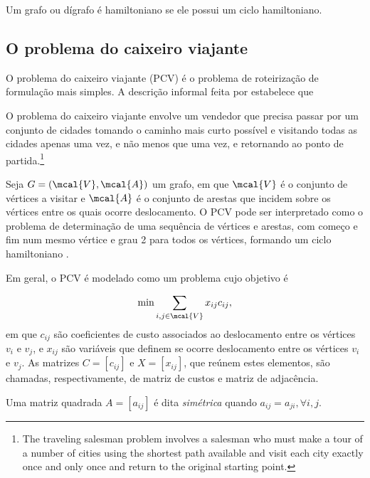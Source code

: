 \begin{mydef}
    Um grafo ou dígrafo é hamiltoniano se ele possui um ciclo hamiltoniano.
\end{mydef}

\subsection{O problema do caixeiro viajante}\label{sec:PCV}
O problema do caixeiro viajante (PCV) é o problema de roteirização de formulação mais simples. A descrição informal feita por \textcite{SAIYED:12} estabelece que

\begin{displayquote}
    O problema do caixeiro viajante envolve um vendedor que precisa passar por um conjunto de cidades tomando o caminho mais curto possível e visitando todas as cidades apenas uma vez, e não menos que uma vez, e retornando ao ponto de partida.\footnote{The traveling salesman problem involves a salesman who must make a tour of a number of cities using the shortest path available and visit each city exactly once and only once and return to the original starting point.}
\end{displayquote}

Seja $G = (\mcal{V}, \mcal{A})$ um grafo, em que $\mcal{V}$ é o conjunto de vértices a visitar e $\mcal{A}$ é o conjunto de arestas que incidem sobre os vértices entre os quais ocorre deslocamento. O PCV pode ser interpretado como o problema de determinação de uma sequência de vértices e arestas, com começo e fim num mesmo vértice e grau 2 para todos os vértices, formando um ciclo hamiltoniano \cite{ZAMBITO:06}.

Em geral, o PCV é modelado como um problema cujo objetivo é

\begin{equation}
    \min\sum_{i,j \in \mcal{V}}{x_{ij}c_{ij}},
\end{equation}
em que $c_{ij}$ são coeficientes de custo associados ao deslocamento entre os vértices $v_i$ e $v_j$, e $x_{ij}$ são variáveis que definem se ocorre deslocamento entre os vértices $v_i$ e $v_j$. As matrizes $C = [c_{ij}]$ e $X = [x_{ij}]$, que reúnem estes elementos, são chamadas, respectivamente, de matriz de custos e matriz de adjacência.

\begin{mydef}
    Uma matriz quadrada $A = [a_{ij}]$ é dita \emph{simétrica} quando $a_{ij} = a_{ji}, \forall i, j$.
\end{mydef}

